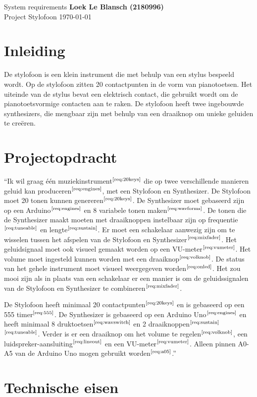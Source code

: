 \documentclass[12pt, a4paper, dutch]{article}
\newcommand{\req}[1]{$^{\text{\ref{req:#1}}}$}
\begin{document}
System requirements \hfill \textbf{Loek Le Blansch (2180996)}\\
Project Stylofoon \hfill \today
\medskip

\section{Inleiding}

De stylofoon is een klein instrument die met behulp van een stylus bespeeld wordt. Op
de stylofoon zitten 20 contactpunten in de vorm van pianotoetsen. Het uiteinde van de
stylus bevat een elektrisch contact, die gebruikt wordt om de pianotoetsvormige
contacten aan te raken. De stylofoon heeft twee ingebouwde synthesizers, die mengbaar
zijn met behulp van een draaiknop om unieke geluiden te cre\"eren.

\section{Projectopdracht}

``Ik wil graag één muziekinstrument\req{20keys} die op twee verschillende manieren
geluid kan produceren\req{engines}, met een Stylofoon en Synthesizer. De Stylofoon
moet 20 tonen kunnen genereren\req{20keys}. De Synthesizer moet gebaseerd zijn op een
Arduino\req{engines} en 8 variabele tonen maken\req{wavforms}. De tonen die de
Synthesizer maakt moeten met draaiknoppen instelbaar zijn op frequentie\req{tuneable}
en lengte\req{sustain}. Er moet een schakelaar aanwezig zijn om te wisselen tussen
het afspelen van de Stylofoon en Synthesizer\req{mixfader}. Het geluidsignaal moet
ook visueel gemaakt worden op een VU-meter\req{vumeter}. Het volume moet ingesteld
kunnen worden met een draaiknop\req{volknob}. De status van het gehele instrument
moet visueel weergegeven worden\req{onled}. Het zou mooi zijn als in plaats van een
schakelaar er een manier is om de geluidssignalen van de Stylofoon en Synthesizer te
combineren\req{mixfader}.

De Stylofoon heeft minimaal 20 contactpunten\req{20keys} en is gebaseerd op een 555
timer\req{555}. De Synthesizer is gebaseerd op een Arduino Uno\req{engines} en heeft
minimaal 8 druktoetsen\req{wavswitch} en 2 draaiknoppen\req{sustain}\req{tuneable}.
Verder is er een draaiknop om het volume te regelen\req{volknob}, een
luidspreker-aansluiting\req{lineout} en een VU-meter\req{vumeter}. Alleen pinnen
A0-A5 van de Arduino Uno mogen gebruikt worden\req{a05}.''

\section{Technische eisen}
\end{document}
